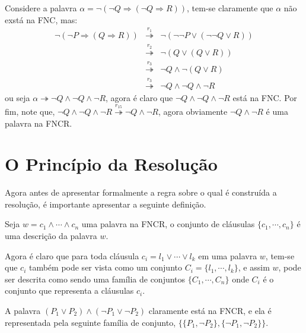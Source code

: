 \begin{exemplo}\label{exe:Reducao1}
  Considere a palavra $\alpha = \neg(\neg Q \Rightarrow (\neg Q \Rightarrow R))$, tem-se claramente que $\alpha$ não exstá na FNC, mas:
  \begin{eqnarray*}
    \neg(\neg P \Rightarrow (Q \Rightarrow R)) & \stackrel{r_1}{\twoheadrightarrow} & \neg(\neg \neg P \lor (\neg \neg Q \lor R)) \\
    & \stackrel{r_2}{\twoheadrightarrow} & \neg(Q \lor (Q \lor R))\\
    & \stackrel{r_3}{\twoheadrightarrow} & \neg Q \land \neg(Q \lor R)\\
    & \stackrel{r_3}{\twoheadrightarrow} & \neg Q \land \neg Q \land \neg R
  \end{eqnarray*}
  ou seja $\alpha \twoheadrightarrow \neg Q \land \neg Q \land \neg R$, agora é claro que $\neg Q \land \neg Q \land \neg R$ está na FNC. Por fim,  note que, $\neg Q \land \neg Q \land \neg R \stackrel{r_{15}}{\twoheadrightarrow} \neg Q \land \neg R$, agora obviamente $\neg Q \land \neg R$ é uma palavra na FNCR.
\end{exemplo}

\section{O Princípio da Resolução}

Agora antes de apresentar formalmente a regra sobre o qual é construída a resolução, é importante apresentar a seguinte definição.

\begin{definicao}
  Seja $w = c_1 \land \cdots \land c_n$ uma palavra na FNCR, o conjunto de cláusulas $\{c_1, \cdots, c_n\}$ é uma descrição da palavra $w$.
\end{definicao}

Agora é claro que para toda cláusula $c_i = l_1 \lor \cdots \lor l_k$ em uma palavra $w$, tem-se que $c_i$ também pode ser vista como um conjunto $C_i = \{l_1, \cdots, l_k\}$, e assim $w$, pode ser descrita como sendo uma família de conjuntos $\{C_1, \cdots, C_n\}$ onde $C_i$ é o conjunto que representa a cláusulas $c_i$.

\begin{exemplo}
  A palavra $(P_1 \lor P_2) \land (\neg P_1 \lor \neg P_2)$ claramente está na FNCR, e ela é representada pela seguinte família de conjunto, $\{\{P_1, \neg P_2\}, \{\neg P_1, \neg P_2\}\}$.
\end{exemplo}